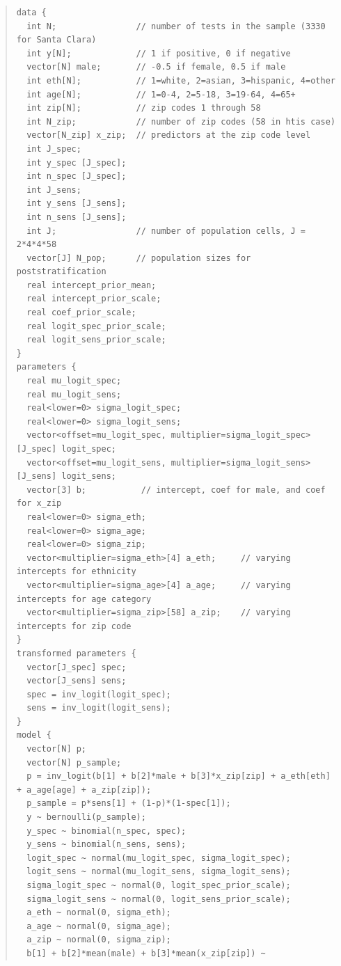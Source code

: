 \documentclass[11pt]{article}
\begin{document}
\vspace{-\baselineskip}
\begin{small}
  \begin{quotation}\noindent
\begin{verbatim}
data {
  int N;                // number of tests in the sample (3330 for Santa Clara)
  int y[N];             // 1 if positive, 0 if negative
  vector[N] male;       // -0.5 if female, 0.5 if male
  int eth[N];           // 1=white, 2=asian, 3=hispanic, 4=other
  int age[N];           // 1=0-4, 2=5-18, 3=19-64, 4=65+
  int zip[N];           // zip codes 1 through 58
  int N_zip;            // number of zip codes (58 in htis case)
  vector[N_zip] x_zip;  // predictors at the zip code level
  int J_spec;
  int y_spec [J_spec];
  int n_spec [J_spec];
  int J_sens;
  int y_sens [J_sens];
  int n_sens [J_sens];
  int J;                // number of population cells, J = 2*4*4*58
  vector[J] N_pop;      // population sizes for poststratification
  real intercept_prior_mean;
  real intercept_prior_scale;
  real coef_prior_scale;
  real logit_spec_prior_scale;
  real logit_sens_prior_scale;
}
parameters {
  real mu_logit_spec;
  real mu_logit_sens;
  real<lower=0> sigma_logit_spec;
  real<lower=0> sigma_logit_sens;
  vector<offset=mu_logit_spec, multiplier=sigma_logit_spec>[J_spec] logit_spec;
  vector<offset=mu_logit_sens, multiplier=sigma_logit_sens>[J_sens] logit_sens;
  vector[3] b;           // intercept, coef for male, and coef for x_zip
  real<lower=0> sigma_eth;
  real<lower=0> sigma_age;
  real<lower=0> sigma_zip;
  vector<multiplier=sigma_eth>[4] a_eth;     // varying intercepts for ethnicity
  vector<multiplier=sigma_age>[4] a_age;     // varying intercepts for age category
  vector<multiplier=sigma_zip>[58] a_zip;    // varying intercepts for zip code
}
transformed parameters {
  vector[J_spec] spec;
  vector[J_sens] sens;
  spec = inv_logit(logit_spec);
  sens = inv_logit(logit_sens);
}
model {
  vector[N] p;
  vector[N] p_sample;
  p = inv_logit(b[1] + b[2]*male + b[3]*x_zip[zip] + a_eth[eth] + a_age[age] + a_zip[zip]);
  p_sample = p*sens[1] + (1-p)*(1-spec[1]);
  y ~ bernoulli(p_sample);
  y_spec ~ binomial(n_spec, spec);
  y_sens ~ binomial(n_sens, sens);
  logit_spec ~ normal(mu_logit_spec, sigma_logit_spec);
  logit_sens ~ normal(mu_logit_sens, sigma_logit_sens);
  sigma_logit_spec ~ normal(0, logit_spec_prior_scale);
  sigma_logit_sens ~ normal(0, logit_sens_prior_scale);
  a_eth ~ normal(0, sigma_eth);
  a_age ~ normal(0, sigma_age);
  a_zip ~ normal(0, sigma_zip);
  b[1] + b[2]*mean(male) + b[3]*mean(x_zip[zip]) ~

\end{verbatim}
\end{quotation}
\end{small}
\end{document}
